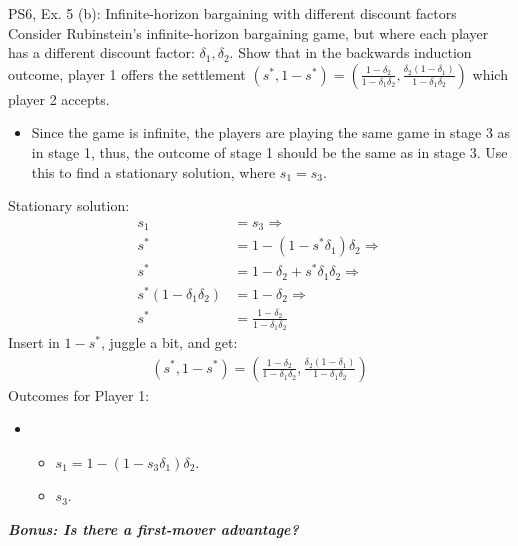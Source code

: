 \begin{frame}{PS6, Ex. 5 (b): Infinite-horizon bargaining with different discount factors}
    Consider Rubinstein's infinite-horizon bargaining game, but where each player has a different discount factor: $\delta_1,\delta_2$. Show that in the backwards induction outcome, player 1 offers the settlement
    $(s^{*},1-s^{*})=\left( \frac{1-\delta_2}{1-\delta_1\delta_2},\frac{\delta_2(1-\delta_1)}{1-\delta_1\delta_2}\right)$
    which player 2 accepts.
    \begin{itemize}
      \item[(Step b)] Since the game is infinite, the players are playing the same game in stage 3 as in stage 1, thus, the outcome of stage 1 should be the same as in stage 3. Use this to find a stationary solution, where $s_{1}=s_{3}$.
    \end{itemize}
  \begin{multicols}{2}
    Stationary solution:
    \begin{align*}
          s_1&= s_3 \Rightarrow\\
        s^{*}&= 1- (1-s^{*}\delta_1)\delta_2 \Rightarrow\\
        s^{*}&= 1-\delta_2+s^{*}\delta_1\delta_2 \Rightarrow\\
        s^{*}(1-\delta_1\delta_2)&= 1-\delta_2 \Rightarrow\\
        s^{*}&= \frac{1-\delta_2}{1-\delta_1\delta_2}
    \end{align*}
    Insert in $1-s^{*}$, juggle a bit, and get:
    \begin{align*}
        (s^{*},1-s^{*})= \left( \frac{1-\delta_2}{1-\delta_1\delta_2},\frac{\delta_2(1-\delta_1)}{1-\delta_1\delta_2}\right)
    \end{align*}
    \vfill\null \columnbreak
    Outcomes for Player 1:
    \begin{itemize}
        \item[]\vspace{-8pt}
            \begin{itemize}\normalsize
            \item[Stage 1:] $s_1 = 1-(1-s_3\delta_1)\delta_2$.
            \item[Stage 3:] $s_3$.
            \end{itemize}
    \end{itemize}
    \textbf{\textit{Bonus: Is there a first-mover advantage?}}
    \vfill\null
  \end{multicols}
    \vfill\null
\end{frame}

